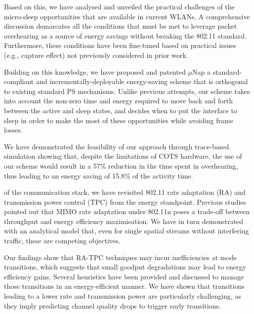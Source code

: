 \documentclass[twoside,nohyper]{tufte-book}
\begin{document}
Based on this, we have analysed and unveiled the practical challenges of the micro-sleep opportunities that are available in current WLANs. A comprehensive discussion demarcates all the conditions that must be met to leverage packet overhearing as a source of energy savings without breaking the 802.11 standard. Furthermore, these conditions have been fine-tuned based on practical issues (e.g., capture effect) not previously considered in prior work.

Building on this knowledge, we have proposed\cite[-1in]{contrib-05a} and patented\cite[-.2in]{contrib-05b} \(\mu\)Nap a standard-compliant and incrementally-deployable energy-saving scheme that is orthogonal to existing standard PS mechanisms. Unlike previous attempts, our scheme takes into account the non-zero time and energy required to move back and forth between the active and sleep states, and decides when to put the interface to sleep in order to make the most of these opportunities while avoiding frame losses.

We have demonstrated the feasibility of our approach through trace-based simulation showing that, despite the limitations of COTS hardware, the use of our scheme would result in a 57\% reduction in the time spent in overhearing, thus leading to an energy saving of 15.8\% of the activity time.

 of the communication stack, we have revisited 802.11 rate adaptation (RA) and transmission power control (TPC) from the energy standpoint. Previous studies pointed out that MIMO rate adaptation under 802.11n poses a trade-off between throughput and energy efficiency maximisation. We have in turn demonstrated with an analytical model that, even for single spatial streams without interfering traffic, these are competing objectives.

Our findings\cite[0pt]{contrib-06} show that RA-TPC techniques may incur inefficiencies at mode transitions, which suggests that small goodput degradations may lead to energy efficiency gains. Several heuristics have been provided and discussed to manage those transitions in an energy-efficient manner. We have shown that transitions leading to a lower rate and transmission power are particularly challenging, as they imply predicting channel quality drops to trigger early transitions.
\end{document}
